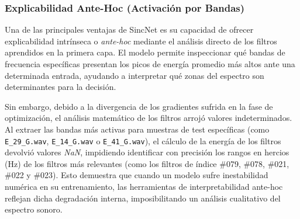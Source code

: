 \subsubsection*{Explicabilidad Ante-Hoc (Activación por Bandas)}

Una de las principales ventajas de SincNet es su capacidad de ofrecer explicabilidad intrínseca o \textit{ante-hoc} mediante el análisis directo de los filtros aprendidos en la primera capa. El modelo permite inspeccionar qué bandas de frecuencia específicas presentan los picos de energía promedio más altos ante una determinada entrada, ayudando a interpretar qué zonas del espectro son determinantes para la decisión.

Sin embargo, debido a la divergencia de los gradientes sufrida en la fase de optimización, el análisis matemático de los filtros arrojó valores indeterminados. Al extraer las bandas más activas para muestras de test específicas (como \texttt{E\_29\_G.wav}, \texttt{E\_14\_G.wav} o \texttt{E\_41\_G.wav}), el cálculo de la energía de los filtros devolvió valores \textit{NaN}, impidiendo identificar con precisión los rangos en hercios (Hz) de los filtros más relevantes (como los filtros de índice \#079, \#078, \#021, \#022 y \#023). Esto demuestra que cuando un modelo sufre inestabilidad numérica en su entrenamiento, las herramientas de interpretabilidad ante-hoc reflejan dicha degradación interna, imposibilitando un análisis cualitativo del espectro sonoro.